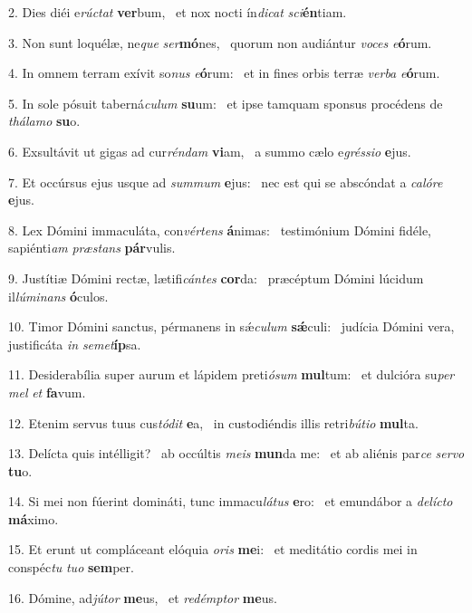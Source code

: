 2. Dies diéi e\textit{rúc}\textit{tat} \textbf{ver}bum, \ast\  et nox nocti ín\textit{di}\textit{cat} \textit{sci}\textbf{én}tiam.\

3. Non sunt loquélæ, ne\textit{que} \textit{ser}\textbf{mó}nes, \ast\  quorum non audiántur \textit{vo}\textit{ces} \textit{e}\textbf{ó}rum.\

4. In omnem terram exívit so\textit{nus} \textit{e}\textbf{ó}rum: \ast\  et in fines orbis terræ \textit{ver}\textit{ba} \textit{e}\textbf{ó}rum.\

5. In sole pósuit taberná\textit{cu}\textit{lum} \textbf{su}um: \ast\  et ipse tamquam sponsus procédens de \textit{thá}\textit{la}\textit{mo} \textbf{su}o.\

6. Exsultávit ut gigas ad cur\textit{rén}\textit{dam} \textbf{vi}am, \ast\  a summo cælo e\textit{grés}\textit{si}\textit{o} \textbf{e}jus.\

7. Et occúrsus ejus usque ad \textit{sum}\textit{mum} \textbf{e}jus: \ast\  nec est qui se abscóndat a \textit{ca}\textit{ló}\textit{re} \textbf{e}jus.\

8. Lex Dómini immaculáta, con\textit{vér}\textit{tens} \textbf{á}nimas: \ast\  testimónium Dómini fidéle, sapiénti\textit{am} \textit{præ}\textit{stans} \textbf{pár}vulis.\

9. Justítiæ Dómini rectæ, lætifi\textit{cán}\textit{tes} \textbf{cor}da: \ast\  præcéptum Dómini lúcidum il\textit{lú}\textit{mi}\textit{nans} \textbf{ó}culos.\

10. Timor Dómini sanctus, pérmanens in sǽ\textit{cu}\textit{lum} \textbf{sǽ}culi: \ast\  judícia Dómini vera, justificáta \textit{in} \textit{se}\textit{met}\textbf{íp}sa.\

11. Desiderabília super aurum et lápidem preti\textit{ó}\textit{sum} \textbf{mul}tum: \ast\  et dulcióra su\textit{per} \textit{mel} \textit{et} \textbf{fa}vum.\

12. Etenim servus tuus cus\textit{tó}\textit{dit} \textbf{e}a, \ast\  in custodiéndis illis retri\textit{bú}\textit{ti}\textit{o} \textbf{mul}ta.\

13. Delícta quis intélligit? \dag\  ab occúltis \textit{me}\textit{is} \textbf{mun}da me: \ast\  et ab aliénis par\textit{ce} \textit{ser}\textit{vo} \textbf{tu}o.\

14. Si mei non fúerint domináti, tunc immacu\textit{lá}\textit{tus} \textbf{e}ro: \ast\  et emundábor a \textit{de}\textit{líc}\textit{to} \textbf{má}ximo.\

15. Et erunt ut compláceant elóquia \textit{o}\textit{ris} \textbf{me}i: \ast\  et meditátio cordis mei in conspéc\textit{tu} \textit{tu}\textit{o} \textbf{sem}per.\

16. Dómine, ad\textit{jú}\textit{tor} \textbf{me}us, \ast\  et \textit{red}\textit{émp}\textit{tor} \textbf{me}us.\

